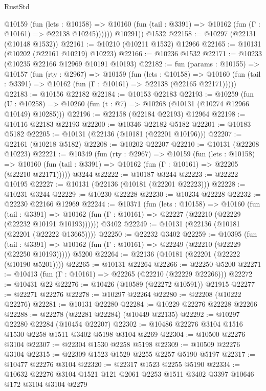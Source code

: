 \begin{lexlean}{RustStd}
\begin{coremodule}
            @10159
              (fun (lets : @10158) =>
              @10160 (fun (tail : @3391) => @10162 (fun (Γ : @10161) => @22138 @10245))))))
        @10291))
    @1532
@22158 := @10297 (@22131 (@10148 @1532))
@22161 := @10210 (@10211 @1532) @12966
@22165 := @10131 (@10202 (@22161 @10219) @10223)
@22166 := @10236 @1532
@22171 := @10233 (@10235 @22166 @12969 @10191 @10193)
@22182 := fun (params : @10155) =>
  @10157
    (fun (rty : @2967) =>
    @10159
      (fun (lets : @10158) =>
      @10160 (fun (tail : @3391) => @10162 (fun (Γ : @10161) => @22138 (@22165 @22171)))))
@22183 := @10156 @22182
@22184 := @10153 @22183
@22193 := @10259
    (fun (U : @10258) => @10260 (fun (t : @7) => @10268 (@10131 (@10274 @12966 @10149) @10285)))
@22196 := @22158 (@22184 @22193) @12964
@22198 := @10116 @22183 @22193
@22200 := @10346 @22182 @5182
@22201 := @10183 @5182
@22205 := @10131 (@22136 (@10181 (@22201 @10196)))
@22207 := @22161 (@10218 @5182)
@22208 := @10202 @22207
@22210 := @10131 (@22208 @10223)
@22221 := @10349
    (fun (rty : @2967) =>
    @10159
      (fun (lets : @10158) =>
      @10160 (fun (tail : @3391) => @10162 (fun (Γ : @10161) => @22205 (@22210 @22171)))))
    @3244
@22222 := @10187 @3244
@22223 := @22222 @10195
@22227 := @10131 (@22136 (@10181 (@22201 @22223)))
@22228 := @10231 @3244
@22229 := @10230 @22228
@22230 := @10234 @22228
@22232 := @22230 @22166 @12969
@22244 := @10371
    (fun (lets : @10158) =>
    @10160
      (fun (tail : @3391) =>
      @10162 (fun (Γ : @10161) => @22227 (@22210 (@22229 (@22232 @10191 @10193))))))
    @3402
@22249 := @10131 (@22136 (@10181 (@22201 (@22222 @13665))))
@22250 := @22232 @3402
@22259 := @10395
    (fun (tail : @3391) => @10162 (fun (Γ : @10161) => @22249 (@22210 (@22229 (@22250 @10193)))))
    @5200
@22264 := @22136 (@10181 (@22201 (@22222 (@10190 @5201))))
@22265 := @10131 @22264
@22266 := @22250 @5200
@22271 := @10413 (fun (Γ : @10161) => @22265 (@22210 (@22229 @22266)))
@22272 := @10431 @22
@22276 := @10426 (@10589 (@22272 @10591)) @21915
@22277 := @22271 @22276
@22278 := @10297 @22264
@22280 := @22208 (@10222 @22276)
@22281 := @10131 @22280
@22284 := @10229 @22276 @22228 @22266
@22288 := @22278 (@22281 @22284) (@10449 @22135)
@22292 := @10297 @22280 @22284 (@10454 @22207)
@22302 := @10486 @22276 @3104 @1516 @1530 @2258 @1511 @3402 @5198 @3104 @2269
@22304 := @10500 @22276 @3104
@22307 := @22304 @1530 @2258 @5198
@22309 := @10509 @22276 @3104
@22315 := @22309 @1523 @1529 @2255 @2257 @5190 @5197
@22317 := @10477 @22276 @3104
@22320 := @22317 @1523 @2255 @5190
@22334 := @10632 @22276 @3104 @1521 @121 @2061 @2253 @1511 @3402 @3397 @10646 @172 @3104 @3104 @2279

\end{coremodule}
\end{lexlean}
